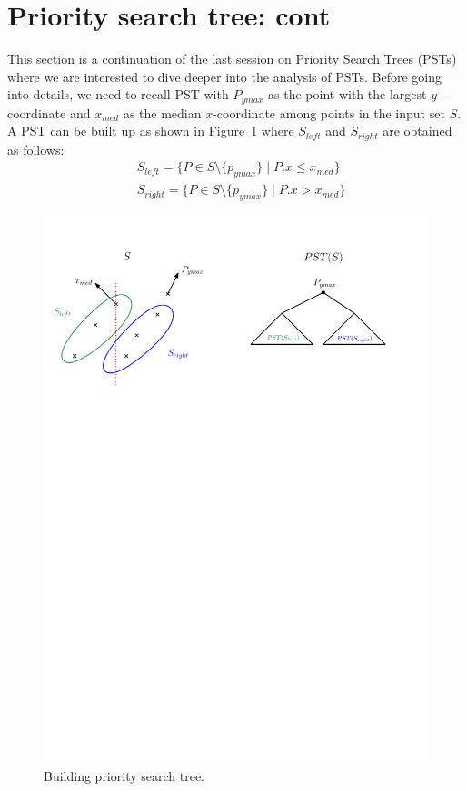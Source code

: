 \section{Priority search tree: cont}
\label{sec:range-queries}

This section is a continuation of the last session on Priority Search Trees (PSTs) where we are interested to dive deeper into the analysis of PSTs. Before going into details, we need to recall PST with $P_{ymax}$ as the point with the largest $y-$coordinate and $x_{med}$ as the median $x$-coordinate among points in the input set $S$. A PST can be built up as shown in Figure~\ref{fig:PST1} where $S_{left}$ and $S_{right}$ are obtained as follows:
\begin{align*}
    & S_{left}=\{P \in S\setminus \{p_{ymax}\} \mid P.x \leq x_{med} \}\\
    &  S_{right}=\{P \in S\setminus \{p_{ymax}\} \mid P.x > x_{med} \}
\end{align*}
\begin{figure}[h!]
\begin{center}
  \includegraphics[scale = .5]{ipe/RQ1.pdf}
  \vspace{-0.1in}
  \caption{Building priority search tree.}
  \label{fig:PST1}
\end{center}
\end{figure}


